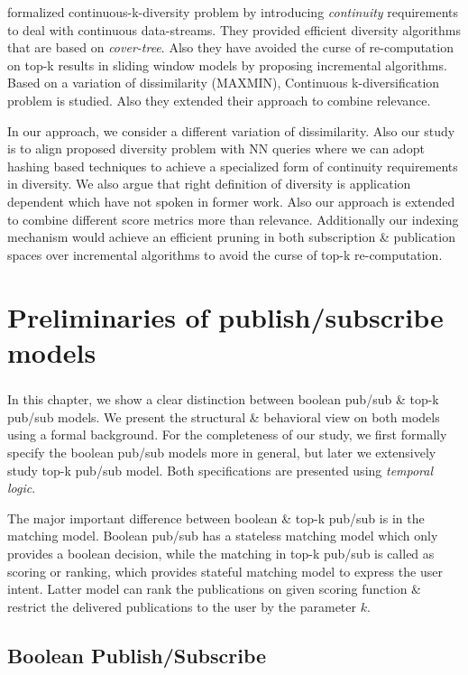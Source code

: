 \documentclass[a4paper,12pt,oneside]{book}
\theoremstyle{definition}
\theoremstyle{remark}
\begin{document}
\cite{Drosou2014ExtendedDiversity} formalized continuous-k-diversity problem by introducing \emph{continuity} requirements to deal with continuous data-streams. They provided efficient diversity algorithms that are based on \emph{cover-tree}. Also they have avoided the curse of re-computation on top-k results in sliding window models by proposing incremental algorithms. Based on a variation of dissimilarity (MAXMIN), Continuous k-diversification problem is studied. Also they extended their approach to combine relevance. 

In our approach, we consider a different variation of dissimilarity. Also our study is to align proposed diversity problem with \ac{NN} queries where we can adopt hashing based techniques to achieve a specialized form of continuity requirements in diversity. We also argue that right definition of diversity is application dependent which have not spoken in former work. Also our approach is extended to combine different score metrics more than relevance. Additionally our indexing mechanism would achieve an efficient pruning in both subscription \& publication spaces over incremental algorithms to avoid the curse of top-k re-computation.  

\chapter{Preliminaries of publish/subscribe models}
\paragraph*{}
In this chapter, we show a clear distinction between boolean pub/sub \& top-k pub/sub models. We present the structural \& behavioral view on both models using a formal background. For the completeness of our study, we first formally specify the boolean pub/sub models more in general, but later we extensively study top-k pub/sub model. Both specifications are presented using \emph{temporal logic}.

The major important difference between boolean \& top-k pub/sub is in the matching model. Boolean pub/sub has a stateless matching model which only provides a boolean decision, while the matching in top-k pub/sub is called as scoring or ranking, which provides stateful matching model to express the user intent. Latter model can rank the publications on given scoring function \& restrict the delivered publications to the user by the parameter $k$.

\section{Boolean Publish/Subscribe}
\end{document}
